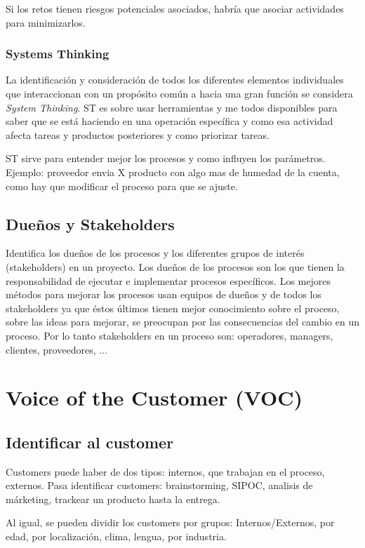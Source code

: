 \documentclass[]{article}
\begin{document}
Si los retos tienen riesgos potenciales asociados, habría que asociar actividades para minimizarlos.

\subsubsection{Systems Thinking}

La identificación y consideración de todos los diferentes elementos individuales que interaccionan con un propósito común a hacia una gran función se considera \textit{System Thinking}. ST es sobre usar herramientas y me todos disponibles para saber que se está haciendo en una operación específica y como esa actividad afecta tareas y productos posteriores y como priorizar tareas.

ST sirve para entender mejor los procesos y como influyen los parámetros. Ejemplo: proveedor envia X producto con algo mas de humedad de la cuenta, como hay que modificar el proceso para que se ajuste. 

\subsection{Dueños y Stakeholders}

Identifica los dueños de los procesos y los diferentes grupos de interés (stakeholders) en un proyecto.
Los dueños de los procesos son los que tienen la responsabilidad de ejecutar e implementar procesos específicos. Los mejores métodos para mejorar los procesos usan equipos de dueños y de todos los stakeholders ya que éstos últimos tienen mejor conocimiento sobre el proceso, sobre las ideas para mejorar, se preocupan por las consecuencias del cambio en un proceso. Por lo tanto stakeholders en un proceso son: operadores, managers, clientes, proveedores, ...

\section{Voice of the Customer (VOC)}

\subsection{Identificar al customer}
Customers puede haber de dos tipos: internos, que trabajan en el proceso, externos. Pasa identificar customers: brainstorming, SIPOC, analisis de márketing, trackear un producto hasta la entrega.

Al igual, se pueden dividir los customers por grupos: Internos/Externos, por edad, por localización, clima, lengua, por industria.
\end{document}
